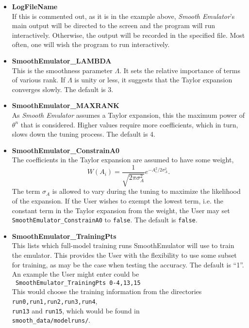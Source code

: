 \documentclass[UserManual.tex]{subfiles}
\begin{document}
\begin{itemize}\itemsep 0pt
\item {\bf LogFileName}\\
If this is commented out, as it is in the example above, {\it Smooth Emulator}'s main output will be directed to the screen and the program will run interactively. Otherwise, the output will be recorded in the specified file. Most often, one will wish the program to run interactively.

\item {\bf SmoothEmulator\_LAMBDA}\\
This is the smoothness parameter $\Lambda$. It sets the relative importance of terms of various rank. If $\Lambda$ is unity or less, it suggests that the Taylor expansion converges slowly. The default is 3.

\item {\bf SmoothEmulator\_MAXRANK}\\
As {\it Smooth Emulator} assumes a Taylor expansion, this the maximum power of $\theta^n$ that is considered. Higher values require more coefficients, which in turn, slows down the tuning process. The default is 4.

\item {\bf SmoothEmulator\_ConstrainA0}\\
The coefficients in the Taylor expansion are assumed to have some weight,
\[
W(A_i)=\frac{1}{\sqrt{2\pi\sigma_A^2}}e^{-A_i^2/2\sigma_A^2}.
\]
The term $\sigma_A$ is allowed to vary during the tuning to maximize the likelihood of the expansion. If the User wishes to exempt the lowest term, i.e. the constant term in the Taylor expansion from the weight, the User may set {\tt SmoothEmulator\_ConstrainA0} to {\tt false}. The default is {\tt false}.

\item {\bf SmoothEmulator\_TrainingPts}\\
This lists which full-model training runs SmoothEmulator will use to train the emulator. This provides the User with the flexibility to use some subset for training, as may be the case when testing the accuracy. The default is ``1''. An example the User might enter could be\\
{\tt ~SmoothEmulator\_TrainingPts  0-4,13,15}\\
This would choose the training information from the directories {\tt run0,run1,run2,run3,run4},\\{\tt run13} and {\tt run15}, which would be found in \\{\tt smooth\_data/modelruns/}.


\end{itemize}
\end{document}
